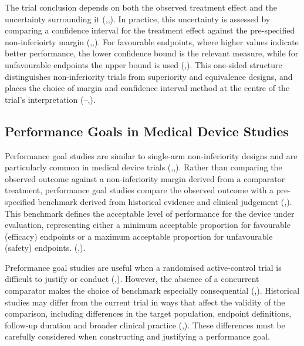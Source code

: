 \documentclass{article}
\begin{document}
The trial conclusion depends on both the observed treatment effect and
the uncertainty surrounding it
(,,).
In practice, this uncertainty is assessed by comparing a confidence
interval for the treatment effect against the pre-specified
non-inferioirty margin
(,,).
For favourable endpoints, where higher values indicate better
performance, the lower confidence bound is the relevant measure, while
for unfavourable endpoints the upper bound is used
(,).
This one-sided structure distinguishes non-inferiority trials from
superiority and equivalence designs, and places the choice of margin and
confidence interval method at the centre of the trial's interpretation
(--,).

\subsection{Performance Goals in Medical Device
Studies}\label{performance-goals-in-medical-device-studies}

Performance goal studies are similar to single-arm non-inferiority
designs and are particularly common in medical device trials
(,,).
Rather than comparing the observed outcome against a non-inferiority
margin derived from a comparator treatment, performance goal studies
compare the observed outcome with a pre-specified benchmark derived from
historical evidence and clinical judgement
(,).
This benchmark defines the acceptable level of performance for the
device under evaluation, representing either a minimum acceptable
proportion for favourable (efficacy) endpoints or a maximum acceptable
proportion for unfavourable (safety) endpoints.
(,).

Preformance goal studies are useful when a randomised active-control
trial is difficult to justify or conduct
(,).
However, the absence of a concurrent comparator makes the choice of
benchmark especially consequential
(,).
Historical studies may differ from the current trial in ways that affect
the validity of the comparison, including differences in the target
population, endpoint definitions, follow-up duration and broader
clinical practice
(,).
These differences must be carefully considered when constructing and
justifying a performance goal.
\end{document}
